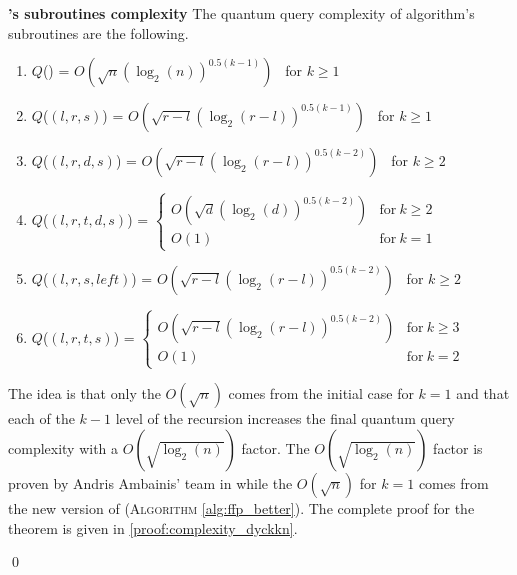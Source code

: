 \begin{theorem}{\textbf{'s subroutines complexity}} \label{th:subroutine_complexity}
    The quantum query complexity of  algorithm's subroutines are the following.
    \begin{enumerate}
        \item $Q$() = $O\left(\sqrt{n}(\log_2(n))^{0.5(k-1)}\right)$ \ for $k \geq 1$
        \item $Q$($(l,r,s)$) = $O\left(\sqrt{r-l}(\log_2(r-l))^{0.5(k-1)}\right)$ \ for $k \geq 1$
        \item $Q$($(l,r,d,s)$) = $O\left(\sqrt{r-l}(\log_2(r-l))^{0.5(k-2)}\right)$ \ for $k \geq 2$
        \item $Q$($(l, r, t, d, s)$) = $\left\{
                  \begin{array}{ll}
                      O\left(\sqrt{d}(\log_2(d))^{0.5(k-2)}\right) & \textrm{for} \ k \geq 2 \\
                      O(1)                                         & \textrm{for} \  k = 1
                  \end{array}
                  \right.$
        \item $Q$($(l,r,s, left)$) = $O\left(\sqrt{r-l}(\log_2(r-l))^{0.5(k-2)}\right)$ \ for $k \geq 2$
        \item $Q$($(l,r,t,s)$) = $\left\{ \begin{array}{ll}
                      O\left(\sqrt{r-l}(\log_2(r-l))^{0.5(k-2)}\right) & \textrm{for} \ k \geq 3 \\
                      O(1)                                             & \textrm{for} \ k = 2
                  \end{array}
                  \right.$
    \end{enumerate}
\end{theorem}

\begin{tproof}
    The idea is that only the $O\left(\sqrt{n}\right)$ comes from the initial
    case for $k = 1$ and that each of the $k-1$ level of the recursion increases
    the final quantum query complexity with a $O\left(\sqrt{\log_2(n)}\right)$
    factor. The $O\left(\sqrt{\log_2(n)}\right)$ factor is proven by Andris
    Ambainis' team in \cite{art:2DGrid} while the $O\left(\sqrt{n}\right)$
    for $k = 1$ comes from the new version of  (\textsc{Algorithm}
    \autoref{alg:ffp_better}). The complete proof for the theorem is given
    in \autoref{proof:complexity_dyckkn}.

    \qed
\end{tproof}

